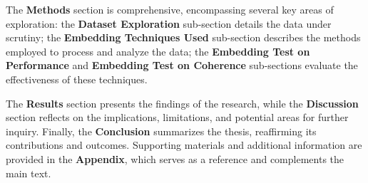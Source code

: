 The \textbf{Methods} section is comprehensive, encompassing several key areas of exploration: the \textbf{Dataset Exploration} sub-section details the data under scrutiny; the \textbf{Embedding Techniques Used} sub-section describes the methods employed to process and analyze the data; the \textbf{Embedding Test on Performance} and \textbf{Embedding Test on Coherence} sub-sections evaluate the effectiveness of these techniques.

The \textbf{Results} section presents the findings of the research, while the \textbf{Discussion} section reflects on the implications, limitations, and potential areas for further inquiry. Finally, the \textbf{Conclusion} summarizes the thesis, reaffirming its contributions and outcomes. Supporting materials and additional information are provided in the \textbf{Appendix}, which serves as a reference and complements the main text.
